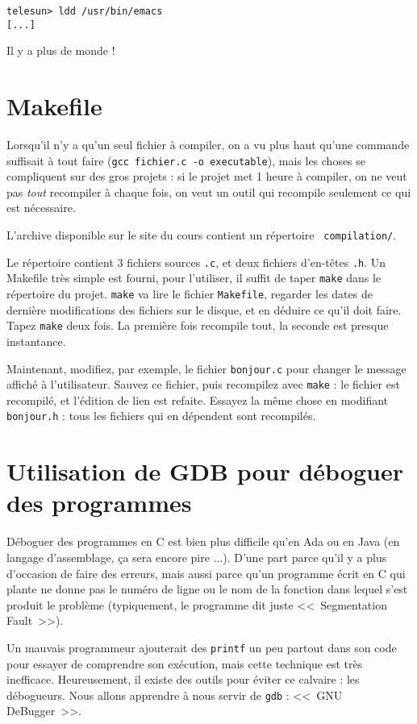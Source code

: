 \documentclass[11pt]{article}
\begin{document}
\begin{verbatim}
telesun> ldd /usr/bin/emacs
[...]
\end{verbatim}

Il y a plus de monde !

\section{Makefile}

Lorsqu'il n'y a qu'un seul fichier à compiler, on a vu plus haut
qu'une commande suffisait à tout faire (\texttt{gcc fichier.c -o
  executable}), mais les choses se compliquent sur des gros projets :
si le projet met 1 heure à compiler, on ne veut pas {\em tout}
recompiler à chaque fois, on veut un outil qui recompile seulement ce
qui est nécessaire.

L'archive disponible sur le site du cours contient un répertoire {\tt
  compilation/}.

Le répertoire contient 3 fichiers sources \texttt{.c}, et deux fichiers
d'en-têtes \texttt{.h}. Un Makefile très simple est fourni, pour
l'utiliser, il suffit de taper \texttt{make} dans le répertoire du
projet. \texttt{make} va lire le fichier \texttt{Makefile}, regarder
les dates de dernière modifications des fichiers sur le disque, et en
déduire ce qu'il doit faire. Tapez \texttt{make} deux fois. La
première fois recompile tout, la seconde est presque instantance.

Maintenant, modifiez, par exemple, le fichier \texttt{bonjour.c} pour
changer le message affiché à l'utilisateur. Sauvez ce fichier, puis
recompilez avec \texttt{make} : le fichier est recompilé, et l'édition
de lien est refaite. Essayez la même chose en modifiant
\texttt{bonjour.h} : tous les fichiers qui en dépendent sont
recompilés.

\section{Utilisation de GDB pour déboguer des programmes}

Déboguer des programmes en C est bien plus difficile qu'en Ada ou en
Java (en langage d'assemblage, ça sera encore pire ...). D'une part
parce qu'il y a plus d'occasion de faire des erreurs,
mais aussi parce qu'un programme écrit en C qui plante ne donne pas le
numéro de ligne ou le nom de la fonction dans lequel s'est produit le
problème (typiquement, le programme dit juste <<~Segmentation Fault~>>).

Un mauvais programmeur ajouterait des \lstinline{printf} un peu
partout dans son code pour essayer de comprendre son exécution, mais
cette technique est très inefficace. Heureusement, il existe des
outils pour éviter ce calvaire : les débogueurs. Nous allons apprendre
à nous servir de {\tt gdb} : <<~GNU DeBugger~>>.
\end{document}
